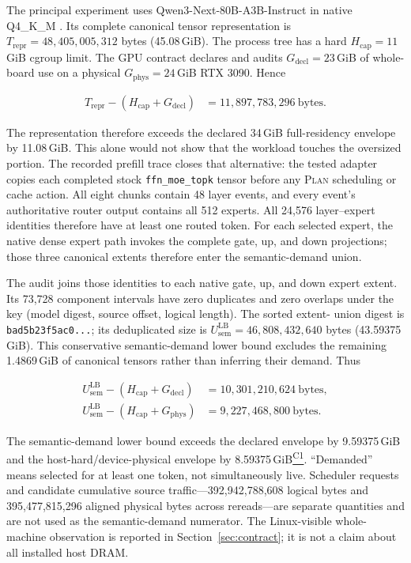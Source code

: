 \documentclass[letterpaper,twocolumn,10pt]{article}
\newcommand{\Plan}{\textsc{Plan}\xspace}
\newcommand{\GiB}{\,GiB\xspace}
\newcommand{\claimref}[1]{\hyperlink{claim:#1}{\textsuperscript{\textsf{#1}}}}
\begin{document}
The principal experiment uses Qwen3-Next-80B-A3B-Instruct in native Q4\_K\_M
\cite{qwen3next,qwen3report}.  Its complete canonical tensor representation is
$T_{\mathrm{repr}}=48{,}405{,}005{,}312$ bytes (45.08\GiB).  The process tree has
a hard $H_{\mathrm{cap}}=11$\GiB cgroup limit.  The GPU contract declares and
audits $G_{\mathrm{decl}}=23$\GiB of whole-board use on a physical
$G_{\mathrm{phys}}=24$\GiB RTX 3090.  Hence

\begin{align*}
T_{\mathrm{repr}}-(H_{\mathrm{cap}}+G_{\mathrm{decl}})
  &=11{,}897{,}783{,}296\ \mathrm{bytes}.
\end{align*}

The representation therefore exceeds the declared 34\GiB full-residency
envelope by 11.08\GiB.  This alone would not show that the workload touches the
oversized portion.  The recorded prefill trace closes that alternative: the
tested adapter copies each completed stock \texttt{ffn\_moe\_topk} tensor
before any \Plan scheduling or cache action.  All eight chunks contain 48 layer
events, and every event's authoritative router output contains all 512 experts.
All 24,576 layer--expert identities therefore have at least one routed token.
For each selected expert, the native dense expert path invokes the complete
gate, up, and down projections; those three canonical extents therefore enter
the semantic-demand union.

The audit joins those identities to each native gate, up, and down expert
extent.  Its 73,728 component intervals have zero duplicates and zero overlaps
under the key (model digest, source offset, logical length).  The sorted extent-
union digest is \texttt{bad5b23f5ac0...}; its deduplicated size is
$U_{\mathrm{sem}}^{\mathrm{LB}}=46{,}808{,}432{,}640$ bytes
(43.59375\GiB).  This conservative semantic-demand lower bound excludes the
remaining 1.4869\GiB of canonical tensors rather than inferring their demand.
Thus

\begin{align*}
U_{\mathrm{sem}}^{\mathrm{LB}}-(H_{\mathrm{cap}}+G_{\mathrm{decl}})
  &=10{,}301{,}210{,}624\ \mathrm{bytes},\\
U_{\mathrm{sem}}^{\mathrm{LB}}-(H_{\mathrm{cap}}+G_{\mathrm{phys}})
  &=9{,}227{,}468{,}800\ \mathrm{bytes}.
\end{align*}

The semantic-demand lower bound exceeds the declared envelope by 9.59375\GiB
and the host-hard/device-physical envelope by 8.59375\GiB\claimref{C1}.
``Demanded'' means selected for at least one token, not simultaneously live.
Scheduler requests and candidate cumulative source traffic---392,942,788,608
logical bytes and 395,477,815,296 aligned physical bytes across rereads---are
separate quantities and are not used as the semantic-demand numerator.  The
Linux-visible whole-machine observation is reported in
Section~\ref{sec:contract}; it is not a claim about all installed host DRAM.
\end{document}
